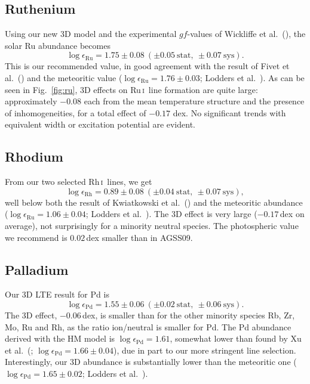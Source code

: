 \documentclass[traditabstract]{aa}
\newcommand{\altrui}{Ru\,\textsc{i}}
\newcommand{\altrhi}{Rh\,\textsc{i}}
\newcommand{\rui}{\altrui\ }
\newcommand{\rhi}{\altrhi\ }
\begin{document}
\subsection{Ruthenium}
Using our new 3D model and the experimental $gf$-values of Wickliffe et al.\ (\cite{wick}), the solar Ru abundance becomes
\begin{displaymath}
\log\epsilon_{\mathrm{Ru}}=1.75\pm0.08\ (\pm0.05\ \mathrm{stat},\ \pm0.07\ \mathrm{sys}).
\end{displaymath}
This is our recommended value, in good agreement with the result of Fivet et al.\ (\cite{five}) and the meteoritic value ($\log \epsilon_{\mathrm{Ru}}=1.76\pm0.03$; Lodders et al.\ \cite{lodd}).  As can be seen in Fig.~\ref{fig:ru}, 3D effects on \rui line formation are quite large: approximately $-0.08$ each from the mean temperature structure and the presence of inhomogeneities, for a total effect of $-0.17$ dex.  No significant trends with equivalent width or excitation potential are evident.

\subsection{Rhodium}
From our two selected \rhi lines, we get
\begin{displaymath}
\log\epsilon_{\mathrm{Rh}}=0.89\pm0.08\ (\pm0.04\ \mathrm{stat},\ \pm0.07\ \mathrm{sys}),
\end{displaymath}
well below both the result of Kwiatkowski et al.\ (\cite{kwia1}) and the meteoritic abundance ($\log \epsilon_{\mathrm{Ru}}=1.06\pm0.04$; Lodders et al.\ \cite{lodd}).
The 3D effect is very large ($-0.17$\,dex on average), not surprisingly for a minority neutral species. The photospheric value we recommend is $0.02$\,dex smaller than in AGSS09.

\subsection{Palladium}
Our 3D LTE result for Pd is 
\begin{displaymath}
\log\epsilon_{\mathrm{Pd}}=1.55\pm0.06\ (\pm0.02\ \mathrm{stat},\ \pm0.06\ \mathrm{sys}).
\end{displaymath}
The 3D effect, $-0.06$\,dex, is smaller than for the other minority species Rb, Zr, Mo, Ru and Rh,
as the ratio ion/neutral is smaller for Pd. The Pd abundance derived with the HM model is $\log \epsilon_{\mathrm{Pd}}=1.61$, somewhat lower than found by Xu et al.\ (\cite{xu}; $\log\epsilon_{\mathrm{Pd}}=1.66\pm0.04$), due in part to our more stringent line selection.  Interestingly, our 3D abundance is substantially lower than the meteoritic one ($\log \epsilon_{\mathrm{Pd}}=1.65\pm0.02$; Lodders et al.\ \cite{lodd}).
\end{document}
